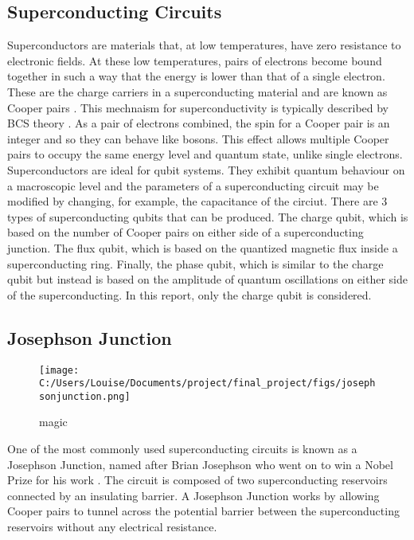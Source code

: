 \documentclass[11pt]{article}
\begin{document}
\subsection{Superconducting Circuits}
Superconductors are materials that, at low temperatures, have zero resistance to electronic fields. At these low temperatures, pairs of electrons become bound together in such a way that the energy is lower than that of a single electron. These are the charge carriers in a superconducting material and are known as Cooper pairs \cite{CooperBoundElectronPairs1956}. This mechnaism for superconductivity is typically described by BCS theory \cite{bardeenTheorySuperconductivity1957}. As a pair of electrons combined, the spin for a Cooper pair is an integer and so they can behave like bosons. This effect allows multiple Cooper pairs to occupy the same energy level and quantum state, unlike single electrons. Superconductors are ideal for qubit systems. They exhibit quantum behaviour on a macroscopic level and the parameters of a superconducting circuit may be modified by changing, for example, the capacitance of the circiut. There are 3 types of superconducting qubits that can be produced. The charge qubit, which is based on the number of Cooper pairs on either side of a superconducting junction. The flux qubit, which is based on the quantized magnetic flux inside a superconducting ring. Finally, the phase qubit, which is similar to the charge qubit but instead is based on the amplitude of quantum oscillations on either side of the superconducting. In this report, only the charge qubit is considered.

\subsection{Josephson Junction}
\begin{figure}[ht]
\centering
\texttt{[image: C:/Users/Louise/Documents/project/final\_project/figs/josephsonjunction.png]}
\caption{magic}
\label{fig:picture1}
\end{figure}
One of the most commonly used superconducting circuits is known as a Josephson Junction, named after Brian Josephson who went on to win a Nobel Prize for his work \cite{josephsonDiscoveryTunnellingSupercurrents1974,josephsonPossibleNewEffects1962}. 
The circuit is composed of two superconducting reservoirs connected by an insulating barrier. 
A Josephson Junction works by allowing Cooper pairs to tunnel across the potential barrier between the superconducting reservoirs without any electrical resistance. 
\end{document}
